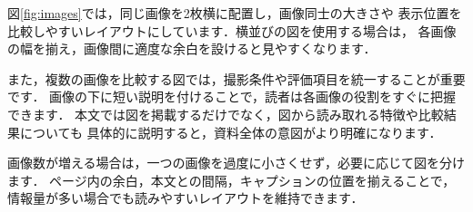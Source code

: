 \documentclass[a4paper,twocolumn,pdflatex,ja=standard]{bxjsarticle}
\begin{document}
図\ref{fig:images}では，同じ画像を2枚横に配置し，画像同士の大きさや
表示位置を比較しやすいレイアウトにしています．横並びの図を使用する場合は，
各画像の幅を揃え，画像間に適度な余白を設けると見やすくなります．

また，複数の画像を比較する図では，撮影条件や評価項目を統一することが重要です．
画像の下に短い説明を付けることで，読者は各画像の役割をすぐに把握できます．
本文では図を掲載するだけでなく，図から読み取れる特徴や比較結果についても
具体的に説明すると，資料全体の意図がより明確になります．

画像数が増える場合は，一つの画像を過度に小さくせず，必要に応じて図を分けます．
ページ内の余白，本文との間隔，キャプションの位置を揃えることで，
情報量が多い場合でも読みやすいレイアウトを維持できます．



\end{document}
